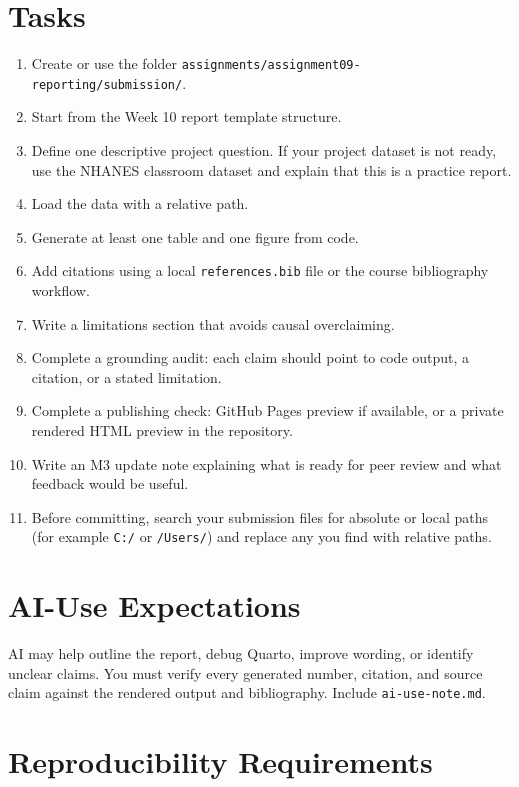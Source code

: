 \documentclass[
  letterpaper,
  DIV=11,
  numbers=noendperiod,
  oneside]{scrreprt}
\providecommand{\tightlist}{%
  \setlength{\itemsep}{0pt}\setlength{\parskip}{0pt}}
\begin{document}
\section{Tasks}\label{tasks-8}

\begin{enumerate}
\def\labelenumi{\arabic{enumi}.}
\tightlist
\item
  Create or use the folder
  \texttt{assignments/assignment09-reporting/submission/}.
\item
  Start from the Week 10 report template structure.
\item
  Define one descriptive project question. If your project dataset is
  not ready, use the NHANES classroom dataset and explain that this is a
  practice report.
\item
  Load the data with a relative path.
\item
  Generate at least one table and one figure from code.
\item
  Add citations using a local \texttt{references.bib} file or the course
  bibliography workflow.
\item
  Write a limitations section that avoids causal overclaiming.
\item
  Complete a grounding audit: each claim should point to code output, a
  citation, or a stated limitation.
\item
  Complete a publishing check: GitHub Pages preview if available, or a
  private rendered HTML preview in the repository.
\item
  Write an M3 update note explaining what is ready for peer review and
  what feedback would be useful.
\item
  Before committing, search your submission files for absolute or local
  paths (for example \texttt{C:/} or \texttt{/Users/}) and replace any
  you find with relative paths.
\end{enumerate}

\section{AI-Use Expectations}\label{ai-use-expectations-8}

AI may help outline the report, debug Quarto, improve wording, or
identify unclear claims. You must verify every generated number,
citation, and source claim against the rendered output and bibliography.
Include \texttt{ai-use-note.md}.

\section{Reproducibility
Requirements}\label{reproducibility-requirements-8}
\end{document}
